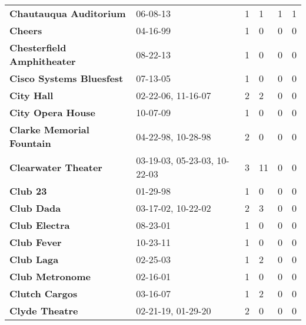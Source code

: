 \begin{supertabular}{llllll}
                                       \textbf{Chautauqua Auditorium} &                      06-08-13 &  1 &   1 &  1 &  1 \\
                                                      \textbf{Cheers} &                      04-16-99 &  1 &   0 &  0 &  0 \\
                                   \textbf{Chesterfield Amphitheater} &                      08-22-13 &  1 &   0 &  0 &  0 \\
                                     \textbf{Cisco Systems Bluesfest} &                      07-13-05 &  1 &   0 &  0 &  0 \\
                                                   \textbf{City Hall} &            02-22-06, 11-16-07 &  2 &   2 &  0 &  0 \\
                                            \textbf{City Opera House} &                      10-07-09 &  1 &   0 &  0 &  0 \\
                                    \textbf{Clarke Memorial Fountain} &            04-22-98, 10-28-98 &  2 &   0 &  0 &  0 \\
                                          \textbf{Clearwater Theater} &  03-19-03, 05-23-03, 10-22-03 &  3 &  11 &  0 &  0 \\
                                                     \textbf{Club 23} &                      01-29-98 &  1 &   0 &  0 &  0 \\
                                                   \textbf{Club Dada} &            03-17-02, 10-22-02 &  2 &   3 &  0 &  0 \\
                                                \textbf{Club Electra} &                      08-23-01 &  1 &   0 &  0 &  0 \\
                                                  \textbf{Club Fever} &                      10-23-11 &  1 &   0 &  0 &  0 \\
                                                   \textbf{Club Laga} &                      02-25-03 &  1 &   2 &  0 &  0 \\
                                              \textbf{Club Metronome} &                      02-16-01 &  1 &   0 &  0 &  0 \\
                                               \textbf{Clutch Cargos} &                      03-16-07 &  1 &   2 &  0 &  0 \\
                                               \textbf{Clyde Theatre} &            02-21-19, 01-29-20 &  2 &   0 &  0 &  0 \\

\end{supertabular}
